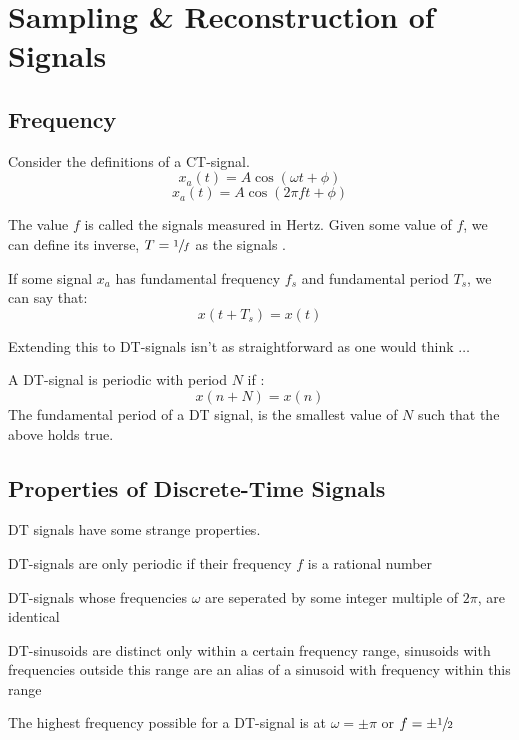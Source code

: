 \chapter{Sampling \& Reconstruction of Signals}

\section{Frequency}

Consider the definitions of a CT-signal.
\[	x_a (t) = A\cos{(\omega t + \phi)}	\]
\[	x_a (t) = A\cos{(2\pi f t + \phi)}	\]

The value $f$ is called the signals  measured in Hertz. Given some value of $f$, we can define its inverse, $T = \sfrac{1}{f}$ as the  signals .

If some signal $x_a$ has fundamental frequency $f_s$ and fundamental period $T_s$, we can say that:
\[ x\left( t + T_s \right) = x \left(t\right)	\]

Extending this to DT-signals isn't as straightforward as one would think $\ldots$

A DT-signal is periodic with period $N$ if :
\[	x\left(n + N\right)	= x\left(n\right)\]
The fundamental period of a DT signal, is the smallest value of $N$ such that the above holds true.

\section{Properties of Discrete-Time Signals}

DT signals have some strange properties.
\begin{bullets}
	\item DT-signals are only periodic if their frequency $f$ is a rational number
	\item DT-signals whose frequencies $\omega$ are seperated by some integer multiple of $2\pi$, are identical	 
	\item DT-sinusoids are distinct only within a certain frequency range, sinusoids with frequencies outside this range are an alias of a sinusoid with frequency within this range
	\item The highest frequency possible for a DT-signal is at $\omega=\pm\pi$ or $f=\pm\sfrac{1}{2}$
\end{bullets}

